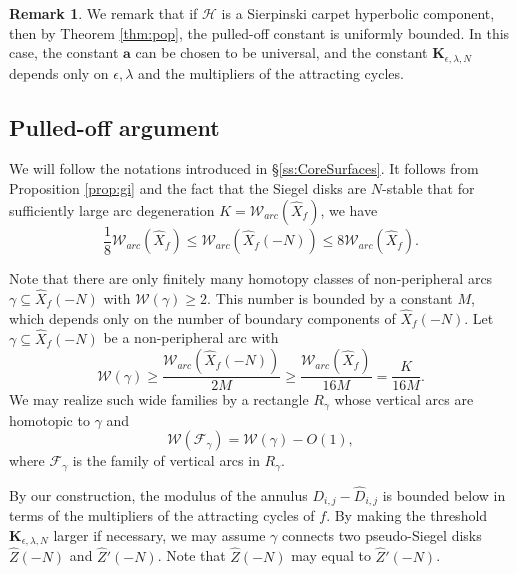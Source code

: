 \documentclass[11pt, reqno]{amsart}
\numberwithin{equation}{section}
\theoremstyle{plain}
\theoremstyle{theorem}
\theoremstyle{plain}
\theoremstyle{definition}
\newtheorem{rmk}[theorem]{Remark}
\numberwithin{figure}{section}
\begin{document}
\begin{rmk}
    We remark that if $\mathcal{H}$ is a Sierpinski carpet hyperbolic component, then by Theorem \ref{thm:pop}, the pulled-off constant is uniformly bounded.
    In this case, the constant $\mathbf{a}$ can be chosen to be universal, and the constant $\mathbf{K}_{\epsilon,\lambda, N}$ depends only on $\epsilon, \lambda$ and the multipliers of the attracting cycles.
\end{rmk}

\subsection*{Pulled-off argument}
We will follow the notations introduced in \S \ref{ss:CoreSurfaces}.
It follows from Proposition \ref{prop:gi} and the fact that the Siegel disks are $N$-stable that for sufficiently large arc degeneration $K = \mathcal{W}_{arc}(\widehat X_f)$, we have
$$
\frac{1}{8}\mathcal{W}_{arc}(\widehat X_f) \leq \mathcal{W}_{arc}(\widehat X_f(-N)) \leq 8 \mathcal{W}_{arc}(\widehat X_f).
$$

Note that there are only finitely many homotopy classes of non-peripheral arcs $\gamma \subseteq \widehat X_f(-N)$ with $\mathcal{W}(\gamma) \geq 2$.
This number is bounded by a constant $M$, which depends only on the number of boundary components of $\widehat X_f(-N)$.
Let $\gamma \subseteq \widehat X_f(-N)$ be a non-peripheral arc with 
$$
\mathcal{W}(\gamma) \geq \frac{\mathcal{W}_{arc}(\widehat X_f(-N))}{2M} \geq \frac{\mathcal{W}_{arc}(\widehat X_f)}{16M} = \frac{K}{16M}.
$$
We may realize such wide families by a rectangle $R_{\gamma}$ whose vertical arcs are homotopic to $\gamma$ and 
$$
\mathcal{W}(\mathcal{F}_\gamma) = \mathcal{W}(\gamma) - O(1),
$$
where $\mathcal{F}_\gamma$ is the family of vertical arcs in $R_{\gamma}$.

By our construction, the modulus of the annulus $D_{i,j} - \widehat D_{i,j}$ is bounded below in terms of the multipliers of the attracting cycles of $f$.
By making the threshold $\mathbf{K}_{\epsilon,\lambda, N}$ larger if necessary, we may assume $\gamma$ connects two pseudo-Siegel disks $\widehat Z(-N)$ and $\widehat Z'(-N)$.
Note that $\widehat Z(-N)$ may equal to $\widehat Z'(-N)$.
\end{document}
